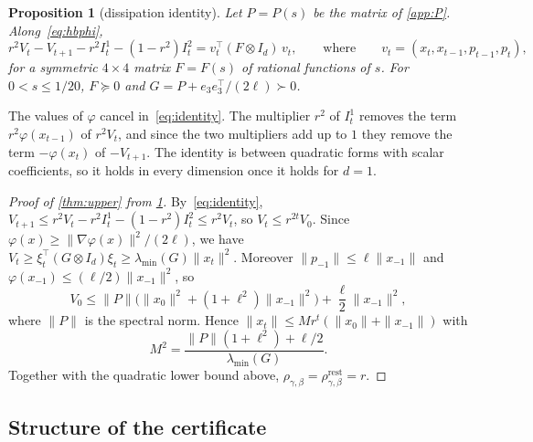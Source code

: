 \documentclass[11pt, a4paper]{article}
\newtheorem{proposition}{Proposition}
\theoremstyle{definition}
\newcommand{\rest}{\mathrm{rest}}
\begin{document}
\begin{proposition}[dissipation identity]
  \label{prop:identity}
  Let $P=P(s)$ be the matrix of \cref{app:P}. Along~\eqref{eq:hbphi},
  \begin{equation}
    r^2V_t-V_{t+1}-r^2I^1_t-(1-r^2)I^2_t=v_t^\top(F\otimes I_d)\,v_t,\qquad\text{where}\qquad
    v_t=(x_t,x_{t-1},p_{t-1},p_t),
    \label{eq:identity}
  \end{equation}
  for a symmetric $4\times4$ matrix $F=F(s)$ of rational functions of $s$. For $0<s\le1/20$, $F\succeq0$ and
  $G=P+e_3e_3^\top/(2\ell)\succ0$.
\end{proposition}

The values of $\varphi$ cancel in~\eqref{eq:identity}. The multiplier $r^2$ of $I^1_t$ removes the term
$r^2\varphi(x_{t-1})$ of $r^2V_t$, and since the two multipliers add up to $1$ they remove the term $-\varphi(x_t)$ of
$-V_{t+1}$. The identity is between quadratic forms with scalar coefficients, so it holds in
every dimension once it holds for $d=1$.

\begin{proof}[Proof of \cref{thm:upper} from \cref{prop:identity}]
  By~\eqref{eq:identity}, $V_{t+1}\le r^2V_t-r^2I^1_t-(1-r^2)I^2_t\le r^2V_t$, so $V_t\le r^{2t}V_0$. Since
  $\varphi(x)\ge\|\nabla\varphi(x)\|^2/(2\ell)$, we have $V_t\ge\xi_t^\top(G\otimes I_d)\xi_t\ge\lambda_{\min}(G)\|x_t\|^2$.
  Moreover $\|p_{-1}\|\le\ell\|x_{-1}\|$ and $\varphi(x_{-1})\le(\ell/2)\|x_{-1}\|^2$, so
  \[
    V_0\le\|P\|\bigl(\|x_0\|^2+(1+\ell^2)\|x_{-1}\|^2\bigr)+\frac\ell2\|x_{-1}\|^2,
  \]
  where $\|P\|$ is the spectral norm.
  Hence $\|x_t\|\le Mr^t(\|x_0\|+\|x_{-1}\|)$ with
  \[
    M^2=\frac{\|P\|(1+\ell^2)+\ell/2}{\lambda_{\min}(G)}.
  \]
  Together with the quadratic lower bound above, $\rho_{\gamma,\beta}=\rho^\rest_{\gamma,\beta}=r$.
\end{proof}

\subsection{Structure of the certificate}
\end{document}
